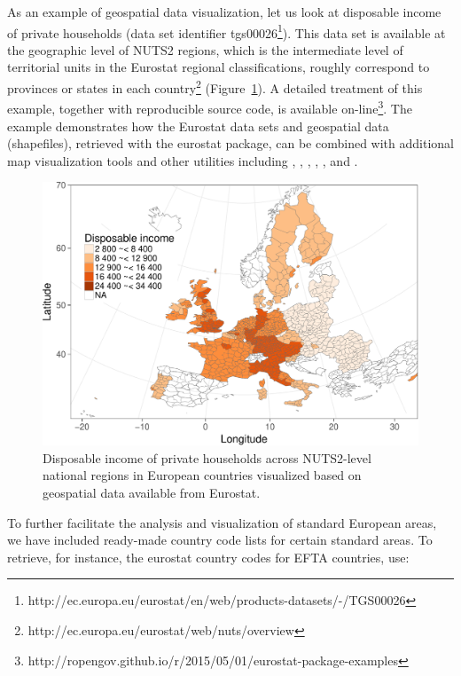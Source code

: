 As an example of geospatial data visualization, let us look at
disposable income of private households (data set identifier
tgs00026\footnote{http://ec.europa.eu/eurostat/en/web/products-datasets/-/TGS00026}). This
data set is available at the geographic level of NUTS2 regions, which
is the intermediate level of territorial units in the Eurostat
regional classifications, roughly correspond to provinces or states in
each country\footnote{http://ec.europa.eu/eurostat/web/nuts/overview}
(Figure~\ref{fig:mapexample}). A detailed treatment of this example, together with reproducible
source code, is available
on-line\footnote{http://ropengov.github.io/r/2015/05/01/eurostat-package-examples}. The
example demonstrates how the Eurostat data sets and geospatial data
(shapefiles), retrieved with the eurostat package, can be combined
with additional map visualization tools and other utilities including
 \citep{grid},  \citep{maptools},  \citep{rgdal},
 \citep{rgeos},  \citep{scales}, and
 \citep{stringr}.


\begin{figure}
\begin{center}
\includegraphics{2015-manu-mapexample-1}
\caption{Disposable income of private households across NUTS2-level national regions in European countries visualized based on geospatial data available from Eurostat.}
\label{fig:mapexample}
\end{center}
\end{figure}


To further facilitate the analysis and visualization of standard
European areas, we have included ready-made country code lists for
certain standard areas. To retrieve, for instance, the eurostat
country codes for EFTA countries, use:

